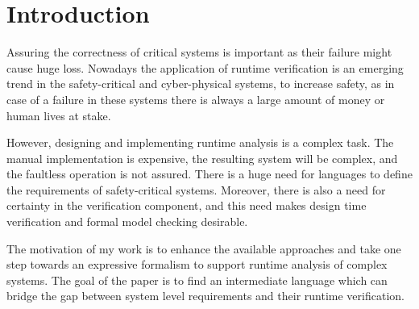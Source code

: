 \chapter{Introduction}
\label{chap:intro}

Assuring the correctness of critical systems is important as their failure might cause huge loss.
Nowadays the application of runtime verification is an emerging trend in the safety-critical and cyber-physical systems, to increase safety, as in case of a failure in these systems there is always a large amount of money or human lives at stake. 

However, designing and implementing runtime analysis is a complex task. The manual implementation is expensive, the resulting system will be complex, and the faultless operation is not assured.
There is a huge need for languages to define the requirements of safety-critical systems.
Moreover, there is also a need for certainty in the verification component, and this need makes design time verification and formal model checking desirable. 

The motivation of my work is to enhance the available approaches and take one step towards an expressive formalism to support runtime analysis of complex systems.
The goal of the paper is to find an intermediate language which can bridge the gap between system level requirements and their runtime verification.


